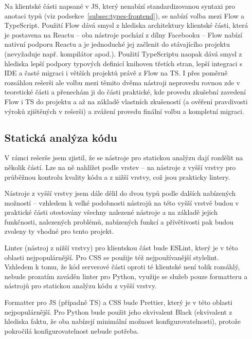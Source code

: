 Na klientské části napsané v JS, který nenabízí standardizovanou syntaxi pro anotaci typů (viz podsekce~\ref{subsec:types-frontend}), se nabízí volba mezi Flow a TypeScript. Použití Flow dává smysl z hlediska architektury klientské části, která je postavena na Reactu -- oba nástroje pochází z dílny Facebooku -- Flow nabízí nativní podporu Reactu a je jednoduché jej začlenit do stávajícího projektu (nevyžaduje např. kompilátor apod.). Použití TypeScriptu naopak dává smysl z hlediska lepší podpory typových definicí knihoven třetích stran, lepší integraci s IDE a časté migraci i větších projektů právě z Flow na TS. I přes poměrně rozsáhlou rešerši ale volbu mezi těmito dvěma nástroji neprovedu rovnou zde v teoretické části a přenechám ji do části praktické, kde provedu zkušební zavedení Flow i TS do projektu a až na základě vlastních zkušeností (a ověření pravdivosti výroků zjištěných v rešerši) a zvážení provedu finální volbu a kompletní migraci.

\subsection{Statická analýza kódu}

V rámci rešerše jsem zjistil, že se nástroje pro statickou analýzu dají rozdělit na několik částí. Lze na ně nahlížet podle vrstev -- na nástroje z vyšší vrstvy pro průběžnou kontrolu kvality kódu a z nižší vrstvy, což jsou prakticky lintery.

Nástroje z vyšší vrstvy jsem dále dělil do dvou typů podle dalších nabízených možností -- vzhledem k velké podobnosti nástrojů na této vyšší vrstvě budou v praktické části otestovány všechny nalezené nástroje a na základě jejich funkčnosti, nalezených problémů, nabízených funkcí a přívětivosti pak budou zvoleny ty vhodné pro tento projekt.

Linter (nástroj z nižší vrstvy) pro klientskou část bude ESLint, který je v této oblasti nejpopulárnější. Pro CSS se použije též nejpoužívanější stylelint. Vzhledem k tomu, že kód serverové části oproti té klientské není tolik rozsáhlý, nebude prozatím zaváděn linter pro Python, využije se služeb pouze formatteru a nástrojů pro statickou analýzu kódu z vyšší vrstvy.

Formatter pro JS (případně TS) a CSS bude Prettier, který je v této oblasti nejpopulárnější. Pro Python bude použit jeho ekvivalent Black (ekvivalent z hlediska faktu, že oba nabízejí minimální možnost konfigurovatelnosti), protože pokročilá konfigurovatelnost nebude potřeba.
